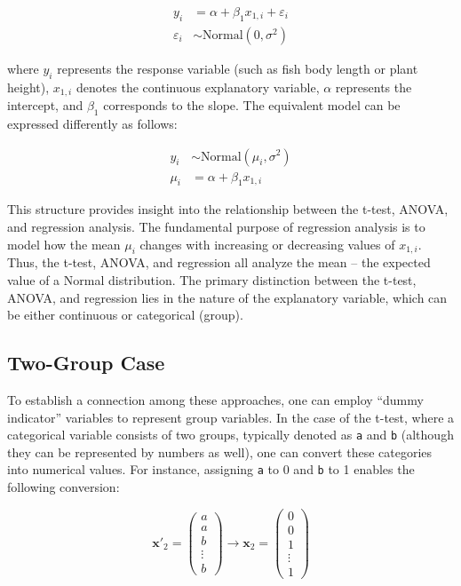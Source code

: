 \documentclass[
]{book}
\begin{document}
\[
\begin{aligned}
y_i &= \alpha + \beta_1 x_{1,i} + \varepsilon_i\\
\varepsilon_i &\sim \text{Normal}(0, \sigma^2)
\end{aligned}
\]

where \(y_i\) represents the response variable (such as fish body length or plant height), \(x_{1,i}\) denotes the continuous explanatory variable, \(\alpha\) represents the intercept, and \(\beta_1\) corresponds to the slope. The equivalent model can be expressed differently as follows:

\[
\begin{aligned}
y_i &\sim \text{Normal}(\mu_i, \sigma^2)\\
\mu_i &= \alpha + \beta_1 x_{1,i}
\end{aligned}
\]

This structure provides insight into the relationship between the t-test, ANOVA, and regression analysis. The fundamental purpose of regression analysis is to model how the mean \(\mu_i\) changes with increasing or decreasing values of \(x_{1,i}\). Thus, the t-test, ANOVA, and regression all analyze the mean -- the expected value of a Normal distribution. The primary distinction between the t-test, ANOVA, and regression lies in the nature of the explanatory variable, which can be either continuous or categorical (group).

\hypertarget{two-group-case}{%
\subsection{Two-Group Case}\label{two-group-case}}

To establish a connection among these approaches, one can employ ``dummy indicator'' variables to represent group variables. In the case of the t-test, where a categorical variable consists of two groups, typically denoted as \texttt{a} and \texttt{b} (although they can be represented by numbers as well), one can convert these categories into numerical values. For instance, assigning \texttt{a} to 0 and \texttt{b} to 1 enables the following conversion:

\[
\pmb{x'}_2 =
 \begin{pmatrix}
   a\\
   a\\
   b\\
   \vdots\\
   b\end{pmatrix}
\rightarrow
\pmb{x}_2 =
\begin{pmatrix}
0\\
0\\
1\\
\vdots\\
1
\end{pmatrix}
\]
\end{document}
